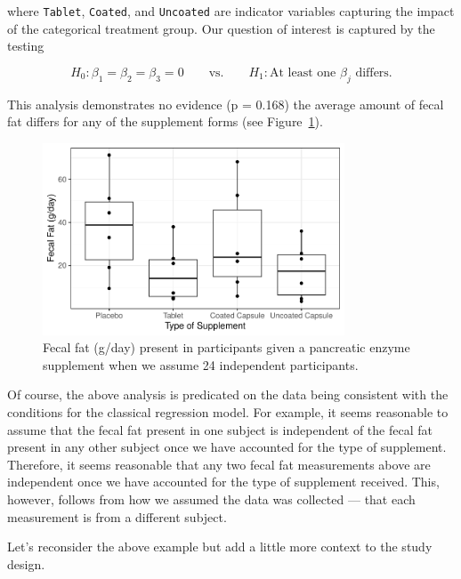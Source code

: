 \documentclass[
  letterpaper,
  DIV=11,
  numbers=noendperiod]{scrreprt}
\theoremstyle{definition}
\theoremstyle{definition}
\theoremstyle{remark}
\begin{document}
where \texttt{Tablet}, \texttt{Coated}, and \texttt{Uncoated} are
indicator variables capturing the impact of the categorical treatment
group. Our question of interest is captured by the testing

\[H_0: \beta_1 = \beta_2 = \beta_3 = 0 \qquad \text{vs.} \qquad H_1: \text{At least one } \beta_j \text{ differs}.\]

This analysis demonstrates no evidence (p = 0.168) the average amount of
fecal fat differs for any of the supplement forms (see
Figure~\ref{fig-rm-terminology-enzyme-plot}).

\begin{figure}

{\centering \includegraphics[width=0.8\textwidth,height=\textheight]{./images/fig-rm-terminology-enzyme-plot-1.pdf}

}

\caption{\label{fig-rm-terminology-enzyme-plot}Fecal fat (g/day) present
in participants given a pancreatic enzyme supplement when we assume 24
independent participants.}

\end{figure}

Of course, the above analysis is predicated on the data being consistent
with the conditions for the classical regression model. For example, it
seems reasonable to assume that the fecal fat present in one subject is
independent of the fecal fat present in any other subject once we have
accounted for the type of supplement. Therefore, it seems reasonable
that any two fecal fat measurements above are independent once we have
accounted for the type of supplement received. This, however, follows
from how we assumed the data was collected --- that each measurement is
from a different subject.

Let's reconsider the above example but add a little more context to the
study design.
\end{document}
